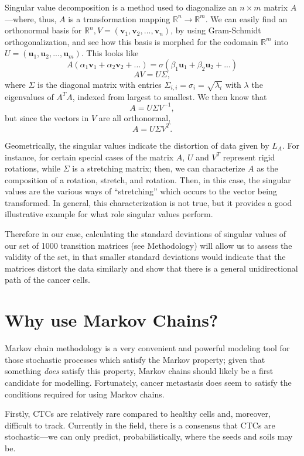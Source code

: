 \documentclass[letterpaper,12pt]{article}
\newcommand{\vect}[1]{\boldsymbol{#1}}
\newcommand{\reals}{\mathbb{R}}
\begin{document}
Singular value decomposition is a method used to diagonalize an $n \times m$ matrix $A$---where, thus, $A$ is a transformation mapping $\reals^n \to \reals^m$. We can easily find an orthonormal basis for $\reals^n, V = (\vect{v}_1, \vect{v}_2, ..., \vect{v}_n)$, by using Gram-Schmidt orthogonalization, and see how this basis is morphed for the codomain $\reals^m$ into $U = (\vect{u}_1, \vect{u}_2, ..., \vect{u}_m)$. This looks like
\[
A(\alpha_1 \vect{v}_1 + \alpha_2 \vect{v}_2 + ...) = \sigma(\beta_1 \vect{u}_1 + \beta_2 \vect{u}_2 + ...)
\]
\[
AV = U\Sigma,
\]
where $\Sigma$ is the diagonal matrix with entries $\Sigma_{i,i} = \sigma_i = \sqrt{\lambda_i}$ with $\lambda$ the eigenvalues of $A^T A$, indexed from largest to smallest. We then know that
\[
A = U \Sigma V^{-1},
\]
but since the vectors in $V$ are all orthonormal,
\[
A = U \Sigma V^T.
\]

Geometrically, the singular values indicate the distortion of data given by $L_A$. For instance, for certain special cases of the matrix $A$, $U$ and $V^T$ represent rigid rotations, while $\Sigma$ is a stretching matrix; then, we can characterize $A$ as the composition of a rotation, stretch, and rotation. Then, in this case, the singular values are the various ways of ``stretching'' which occurs to the vector being transformed. In general, this characterization is not true, but it provides a good illustrative example for what role singular values perform.

Therefore in our case, calculating the standard deviations of singular values of our set of 1000 transition matrices (see Methodology) will allow us to assess the validity of the set, in that smaller standard deviations would indicate that the matrices distort the data similarly and show that there is a general unidirectional path of the cancer cells.

\section{Why use Markov Chains?}

Markov chain methodology is a very convenient and powerful modeling tool for those stochastic processes which satisfy the Markov property; given that something \emph{does} satisfy this property, Markov chains should likely be a first candidate for modelling. Fortunately, cancer metastasis does seem to satisfy the conditions required for using Markov chains.

Firstly, CTCs are relatively rare compared to healthy cells and, moreover, difficult to track. Currently in the field, there is a consensus that CTCs are stochastic---we can only predict, probabilistically, where the seeds and soils may be.
\end{document}
